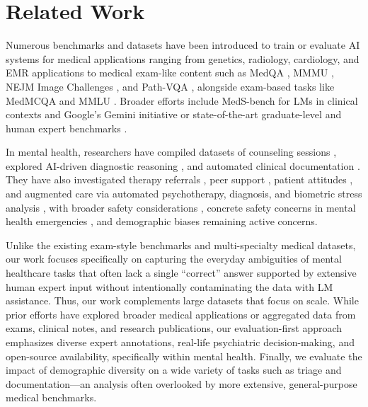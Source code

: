 \section{Related Work}
\label{sec:2_related_work}

Numerous benchmarks and datasets have been introduced to train or evaluate AI systems for medical applications
ranging from genetics, radiology, cardiology, and EMR applications \cite{Hou2023, Zambrano2023, Oh2024} to medical exam-like content such as MedQA \cite{Jin2021}, MMMU \cite{Yue2023}, NEJM Image Challenges \cite{NEJM2024}, and Path-VQA \cite{He2020}, alongside exam-based tasks like MedMCQA \citep{pmlr-v174-pal22a} and MMLU \citep{hendrycks2021measuring}. 
Broader efforts include MedS-bench \citep{Wu2025} for LMs in clinical contexts and Google’s Gemini initiative \cite{Saab2024} or state-of-the-art graduate-level and human expert benchmarks \citep{rein2024gpqa, phan2025humanitysexam}. 

In mental health, researchers have compiled datasets of counseling sessions \citep{Adhikary2024}, explored AI-driven diagnostic reasoning \citep{karthikesalingam2024_14}, and automated clinical documentation \citep{falcetta2023_15, axios2024_16}. 
They have also investigated therapy referrals \citep{sin2024_36, habicht2024_37}, peer support \citep{sharma2023_38}, patient attitudes \citep{pataranutaporn2023_39}, and augmented care via automated psychotherapy, diagnosis, and biometric stress analysis \citep{higgins2023_17, thieme2023_18, li2023_41, balan2024_42, kasula2023_19, ates2024_40}, with broader safety considerations \citep{ganguli2022red, wang2023decodingtrust, zhang2023safetybench, liu2024mmsafetybench}, concrete safety concerns in mental health emergencies \citep{grabb2024risks}, and demographic biases \citep{gabriel_can_2024} remaining active concerns.

Unlike the existing exam-style benchmarks and multi-specialty medical datasets, our work focuses specifically on capturing the everyday ambiguities of mental healthcare tasks that often lack a single “correct” answer supported by extensive human expert input without intentionally contaminating the data with LM assistance. 
Thus, our work complements large datasets \citep[e.g.][]{Wu2025} that focus on scale.
While prior efforts have explored broader medical applications or aggregated data from exams, clinical notes, and research publications, our evaluation-first approach emphasizes diverse expert annotations, real-life psychiatric decision-making, and open-source availability, specifically within mental health. 
Finally, we evaluate the impact of demographic diversity on a wide variety of tasks such as triage and documentation—an analysis often overlooked by more extensive, general-purpose medical benchmarks.

